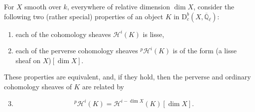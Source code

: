 For \(X\) smooth over \(k\), everywhere of relative dimension \(\dim X\),
consider the following two (rather special) properties of an object \(K\) in
\(\mathrm{D}^b_c(X,\overline{\mathbb{Q}}_\ell)\):
\begin{enumerate}[label=(\arabic*)]
\item each of the cohomology sheaves \(\mathcal{H}^i(K)\) is lisse,
\item each of the perverse cohomology sheaves \({}^p\mathcal{H}^i(K)\) is of
the form (a lisse sheaf on \(X\))\([\dim X]\).
\end{enumerate}
These properties are equivalent, and, if they hold, then the perverse and
ordinary cohomology sheaves of \(K\) are related by
\begin{enumerate}[label=(\arabic*)]
\setcounter{enumi}{2}
\item
\[
  {}^p\mathcal{H}^i(K)=\mathcal{H}^{i-\dim X}(K)[\dim X].
\]
\end{enumerate}

